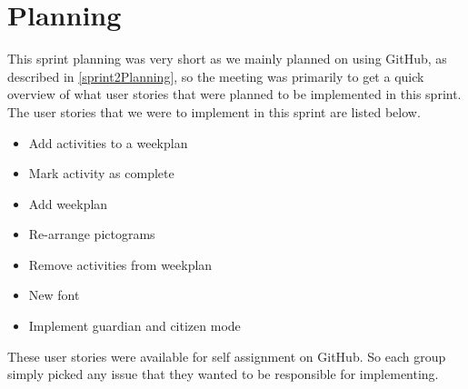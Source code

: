 \section{Planning}
This sprint planning was very short as we mainly planned on using GitHub, as described in \autoref{sprint2Planning}, so the meeting was primarily to get a quick overview of what user stories that were planned to be implemented in this sprint. 
The user stories that we were to implement in this sprint are listed below.

\begin{itemize}
\item Add activities to a weekplan
\item Mark activity as complete
\item Add weekplan
\item Re-arrange pictograms
\item Remove activities from weekplan
\item New font
\item Implement guardian and citizen mode
\end{itemize}

These user stories were available for self assignment on GitHub.
So each group simply picked any issue that they wanted to be responsible for implementing.
